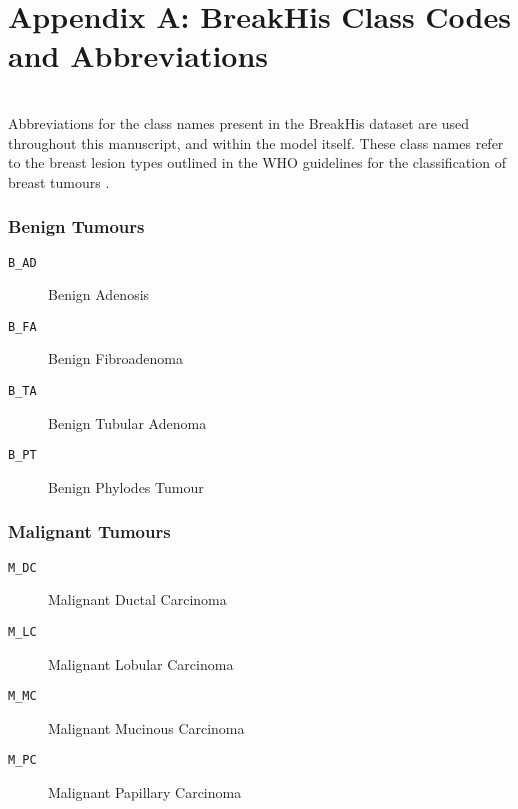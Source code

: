 \chapter*{Appendix A: BreakHis Class Codes and Abbreviations}
\label{sec:class_codes}
\\
Abbreviations for the class names present in the BreakHis dataset are used throughout this manuscript, and within the model itself. These class names refer to the breast lesion types outlined in the WHO guidelines for the classification of breast tumours \citep{who_breast}.\par
\subsection*{Benign Tumours}
\begin{description}  
	\item [\texttt{B\_AD}] Benign Adenosis
	\item [\texttt{B\_FA}] Benign Fibroadenoma
	\item [\texttt{B\_TA}] Benign Tubular Adenoma
	\item [\texttt{B\_PT}] Benign Phylodes Tumour
\end{description}

\subsection*{Malignant Tumours}
\begin{description}  
	\item [\texttt{M\_DC}] Malignant Ductal Carcinoma
	\item [\texttt{M\_LC}] Malignant Lobular Carcinoma
	\item [\texttt{M\_MC}] Malignant Mucinous Carcinoma
	\item [\texttt{M\_PC}] Malignant Papillary Carcinoma
\end{description}